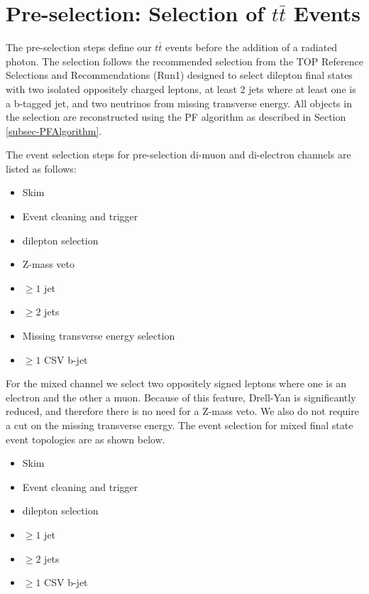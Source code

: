 \section{Pre-selection: Selection of $t\bar{t}$ Events} \label{sec-preselection}

The pre-selection steps define our $t\bar{t}$ events before the addition of a radiated photon. The selection follows the recommended selection from the TOP Reference Selections and Recommendations (Run1) \cite{TopEventSelection} designed to select dilepton final states with two isolated oppositely charged leptons, at least 2 jets where at least one is a b-tagged jet, and two neutrinos from missing transverse energy. All objects in the selection are reconstructed using the PF algorithm as described in Section \ref{subsec-PFAlgorithm}.  

The event selection steps for pre-selection di-muon and di-electron channels are listed as follows:  

\begin{itemize}
	\item Skim
	\item Event cleaning and trigger
	\item dilepton selection
	\item Z-mass veto
	\item $\geq 1$ jet
	\item $\geq 2$ jets
	\item Missing transverse energy selection
	\item $\geq 1$ CSV b-jet 
\end{itemize}

For the mixed channel we select two oppositely signed leptons where one is an electron and the other a muon. Because of this feature, Drell-Yan is significantly reduced, and therefore there is no need for a Z-mass veto. We also do not require a cut on the missing transverse energy. The event selection for mixed final state event topologies are as shown below.

\begin{itemize}
	\item Skim
	\item Event cleaning and trigger
	\item dilepton selection
	\item $\geq 1$ jet
	\item $\geq 2$ jets
	\item $\geq 1$ CSV b-jet 
\end{itemize}  


